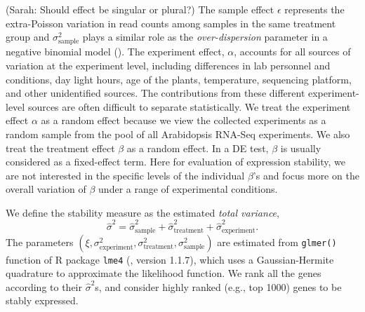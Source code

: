 \documentclass[letterpaper,12pt]{article}
\begin{document}
(Sarah: Should effect be singular or plural?)
The sample effect $\epsilon$ represents the
extra-Poisson variation in read counts among samples in the same treatment
group and $\sigma_{\text{sample}}^2$ plays a similar role as the
\textit{over-dispersion} parameter in a negative binomial model
(\citealt{anders2010differential,di2011nbp}). 
The experiment effect, $\alpha$, accounts for all sources of variation at
the experiment level, including differences in lab personnel and conditions,
day light hours, age of the plants, temperature, sequencing platform, and
other unidentified sources. The contributions from these different
experiment-level sources are often difficult to separate statistically. We
treat the experiment effect $\alpha$ as a random effect because we view the
collected experiments as a random sample from the pool of all Arabidopsis
RNA-Seq experiments. We also treat the treatment effect $\beta$ as a random
effect.  In a DE test, $\beta$ is usually considered as a fixed-effect term.
Here for evaluation of expression stability, we are not interested in the
specific levels of the individual $\beta$'s and focus more on the overall
variation of $\beta$ under a range of experimental conditions.

%

We define the stability measure as the estimated \textit{total variance},
 \begin{equation}\label{eq:totalVariance}
 \hat \sigma^2 =\hat\sigma_{\text{sample}}^2+ \hat\sigma_{\text{treatment}}^2+ \hat\sigma_{\text{experiment}}^2.
 \end{equation}
The parameters $(\xi, \sigma_{\text{experiment}}^2,
\sigma_{\text{treatment}}^2, \sigma_{\text{sample}}^2)$ are estimated from
\verb|glmer()| function of R package \verb"lme4" (\cite{bates2012lme4},
version 1.1.7), which uses a Gaussian-Hermite quadrature to approximate the
likelihood function. 
We rank all the genes according to their $\hat\sigma^2$s, and consider highly
ranked (e.g., top 1000) genes to be stably expressed. 
\end{document}
